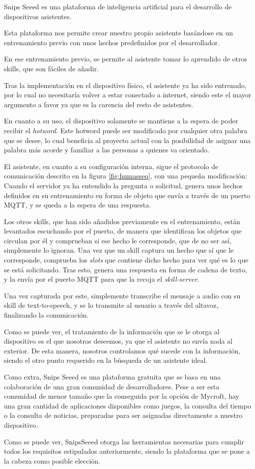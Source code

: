 Snips Seeed es una  plataforma de inteligencia artificial para el desarrollo de dispositivos asistentes.

Esta plataforma nos permite crear nuestro propio asistente basándose en un entrenamiento previo con unos hechos predefinidos por el desarrollador.

En ese entrenamiento previo, se permite al asistente tomar lo aprendido de otros skills, que son fáciles de añadir.

Tras la implementación en el dispositivo físico, el asistente ya ha sido entrenado, por lo cual no necesitaría volver a estar conectado a internet, siendo este el mayor argumento a favor ya que es la carencia del resto de asistentes.

En cuanto a su uso, el dispositivo solamente se mantiene a la espera de poder recibir el \textit{hotword}. Este hotword puede ser modificado por cualquier otra palabra que se desee, lo cual beneficia al proyecto actual con la posibilidad de asignar una palabra más acorde y familiar a las personas a quienes va orientado.

El asistente, en cuanto a su configuración interna, sigue el protocolo de comunicación descrito en la figura \ref{fig:humasseq}, con una pequeña modificación:
Cuando el servidor ya ha entendido la pregunta o solicitud, genera unos hechos definidos en su entrenamiento en forma de objeto que envía a través de un puerto MQTT, y se queda a la espera de una respuesta.

Los otros skills, que han sido añadidos previamente en el entrenamiento, están levantados escuchando por el puerto, de manera que identifican los objetos que circulan por él y comprueban si ese hecho le corresponde, que de no ser así, simplemente lo ignoran.
Una vez que un skill captura un hecho que sí que le corresponde, comprueba los \textit{slots} que contiene dicho hecho para ver qué es lo que se está solicitando. Tras esto, genera una respuesta en forma de cadena de texto, y la envía por el puerto MQTT para que la recoja el \textit{skill-server}.

Una vez capturada por este, simplemente transcribe el mensaje a audio con su skill de text-to-speech, y se lo transmite al usuario a través del altavoz, finalizando la comunicación.

Como se puede ver, el tratamiento de la información que se le otorga al dispositivo es el que nosotros deseemos, ya que el asistente no envía nada al exterior. De esta manera, nosotros controlamos qué sucede con la información, siendo el otro punto requerido en la búsqueda de un asistente ideal.

Como extra, Snips Seeed es una plataforma gratuita que se basa en una colaboración de una gran comunidad de desarrolladores. Pese a ser esta comunidad de menor tamaño que la conseguida por la opción de Mycroft, hay una gran cantidad de aplicaciones disponibles como juegos, la consulta del tiempo o la consulta de noticias, preparadas para ser asignadas directamente a nuestro dispositivo.

Como se puede ver, SnipsSeeed otorga las herramientas necesarias para cumplir todos los requisitos estipulados anteriormente, siendo la plataforma que se pone a la cabeza como posible elección.
